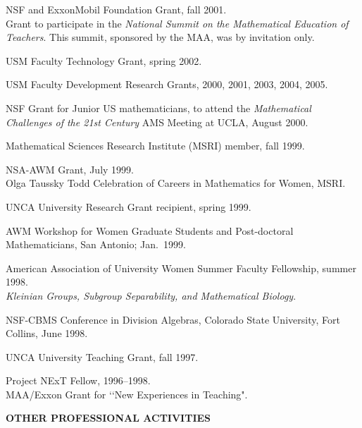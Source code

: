 \documentclass[10pt]{report}
\begin{document}
{NSF and ExxonMobil Foundation Grant, fall 2001. \\
Grant to participate in the {\it National Summit on the Mathematical
Education of Teachers}.  This summit, sponsored by the MAA, was by
invitation only.

USM Faculty Technology Grant, spring 2002.

USM Faculty Development Research Grants, 2000, 2001, 2003, 2004,
2005.

NSF Grant for Junior US mathematicians, to attend the {\it Mathematical
Challenges of the 21st Century} AMS Meeting at UCLA, August 2000.

Mathematical Sciences Research Institute (MSRI) member, fall 1999.  %

NSA-AWM Grant, July 1999.  \\
\hspace{.9in} Olga Taussky Todd Celebration of Careers in Mathematics
for Women, MSRI.

UNCA University Research Grant recipient, spring 1999.

AWM Workshop for Women Graduate Students and Post-doctoral
Mathematicians, San Antonio; Jan.~1999.

American Association of University Women Summer Faculty Fellowship,
summer 1998. \\
\hspace{.9in} {\it Kleinian Groups, Subgroup Separability, and
Mathematical Biology}.

NSF-CBMS Conference in Division Algebras, Colorado State University,
Fort Collins, June 1998.

UNCA University Teaching Grant, fall 1997.

Project NExT Fellow, 1996--1998.  \\
\hspace{.9in} MAA/Exxon Grant for \lq\lq New Experiences in Teaching".

\mbox{}
}

{\bf OTHER PROFESSIONAL ACTIVITIES}

\medskip
\end{document}
